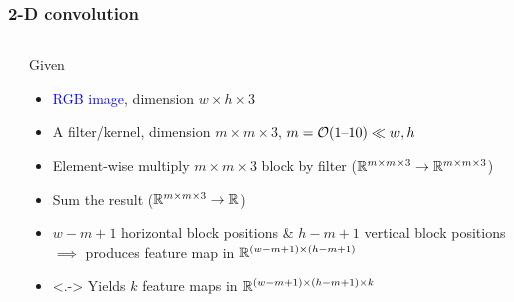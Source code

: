 \begin{frame}
    \frametitle{2-D convolution}
    \begin{columns}
        \begin{column}{0.41\textwidth}
            
        \end{column}
        \begin{column}{0.59\textwidth}
            Given
            \begin{itemize}[<+->]
                \item \textcolor{blue}{RGB image}, dimension $w \times h \times 3$
                \item A \alert{filter}/\alert{kernel}, dimension $m \times m \times 3$, $m = \mathcal{O}(1 \text{--} 10) \ll w, h$
            \end{itemize}
            \begin{itemize}[<.->]
                \item Element-wise multiply $m \times m \times 3$ block by filter ($\mathbb{R}^{m \times m \times 3} \to \mathbb{R}^{m \times m \times 3}$)
                \item Sum the result ($\mathbb{R}^{m \times m \times 3} \to \mathbb{R}$)
                \setcounter{beamerpauses}{9}
                \item<+-> $w - m + 1$ horizontal block positions \& $h - m + 1$ vertical block positions $\implies$ produces \textcolor{Green4}{feature map} in $\mathbb{R}^{(w-m+1) \times (h-m+1)}$
            \end{itemize}

            \begin{itemize}
                \item<.-> Yields $k$ feature maps in $\mathbb{R}^{(w-m+1) \times (h-m+1) \times k}$
            \end{itemize}

        \end{column}
    \end{columns}
\end{frame}

